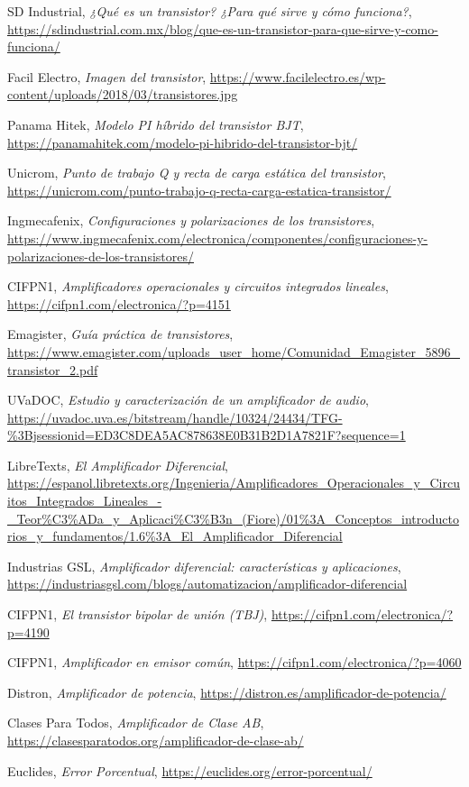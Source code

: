 \documentclass[a4paper,12pt,spanish]{article}
\begin{document}
\begin{thebibliography}{9}

  SD Industrial,
  \textit{¿Qué es un transistor? ¿Para qué sirve y cómo funciona?},
  \url{https://sdindustrial.com.mx/blog/que-es-un-transistor-para-que-sirve-y-como-funciona/}

  Facil Electro,
  \textit{Imagen del transistor},
  \url{https://www.facilelectro.es/wp-content/uploads/2018/03/transistores.jpg}

  Panama Hitek,
  \textit{Modelo PI híbrido del transistor BJT},
  \url{https://panamahitek.com/modelo-pi-hibrido-del-transistor-bjt/}

  Unicrom,
  \textit{Punto de trabajo Q y recta de carga estática del transistor},
  \url{https://unicrom.com/punto-trabajo-q-recta-carga-estatica-transistor/}

  Ingmecafenix,
  \textit{Configuraciones y polarizaciones de los transistores},
  \url{https://www.ingmecafenix.com/electronica/componentes/configuraciones-y-polarizaciones-de-los-transistores/}

  CIFPN1,
  \textit{Amplificadores operacionales y circuitos integrados lineales},
  \url{https://cifpn1.com/electronica/?p=4151}

  Emagister,
  \textit{Guía práctica de transistores},
  \url{https://www.emagister.com/uploads_user_home/Comunidad_Emagister_5896_transistor_2.pdf}

  UVaDOC,
  \textit{Estudio y caracterización de un amplificador de audio},
  \url{https://uvadoc.uva.es/bitstream/handle/10324/24434/TFG-%3Bjsessionid=ED3C8DEA5AC878638E0B31B2D1A7821F?sequence=1}

  LibreTexts,
  \textit{El Amplificador Diferencial},
  \url{https://espanol.libretexts.org/Ingenieria/Amplificadores_Operacionales_y_Circuitos_Integrados_Lineales_-_Teor%C3%ADa_y_Aplicaci%C3%B3n_(Fiore)/01%3A_Conceptos_introductorios_y_fundamentos/1.6%3A_El_Amplificador_Diferencial}

  Industrias GSL,
  \textit{Amplificador diferencial: características y aplicaciones},
  \url{https://industriasgsl.com/blogs/automatizacion/amplificador-diferencial}

  CIFPN1,
  \textit{El transistor bipolar de unión (TBJ)},
  \url{https://cifpn1.com/electronica/?p=4190}

  CIFPN1,
  \textit{Amplificador en emisor común},
  \url{https://cifpn1.com/electronica/?p=4060}

  Distron,
  \textit{Amplificador de potencia},
  \url{https://distron.es/amplificador-de-potencia/}

  Clases Para Todos,
  \textit{Amplificador de Clase AB},
  \url{https://clasesparatodos.org/amplificador-de-clase-ab/}


  Euclides,
  \textit{Error Porcentual},
  \url{https://euclides.org/error-porcentual/}

\end{thebibliography}
\end{document}
